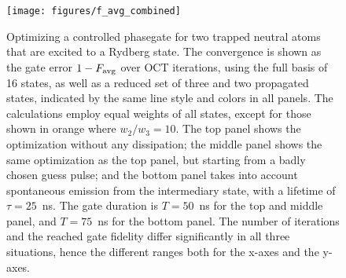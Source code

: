 \begin{figure}[tb] %
  \centering
 \texttt{[image: figures/f\_avg\_combined]}
 \caption[Optimizing a controlled phasegate for two trapped neutral
   atoms that are excited to a Rydberg state.]{Optimizing a controlled phasegate for two trapped neutral
   atoms that are excited to a Rydberg state. The convergence is shown
   as the gate error $1-F_{\operatorname{avg}}$ over OCT iterations, using  the full basis of
   16 states, as well as a reduced set of three and two propagated states,
   indicated by the same line style and colors in all panels.  The
   calculations employ equal weights of all states, except for those shown in
   orange where $w_2 / w_3 = 10$.  The top panel shows the optimization without
   any dissipation; the middle panel shows the same optimization as the top
   panel, but starting from a badly chosen guess pulse; and the bottom panel
   takes into account spontaneous emission from the intermediary state, with
   a lifetime of $\tau = 25$~ns. The gate duration is $T=50$~ns for the top and
   middle panel, and $T=75$~ns for the bottom panel. The number of iterations
   and the reached gate fidelity differ significantly in all three situations,
   hence the different ranges both for the x-axes and the y-axes.}
  \label{fig:converg:Rydberg}
\end{figure}


